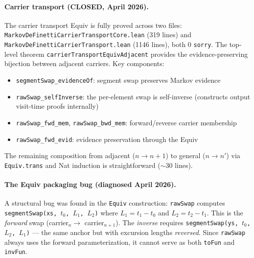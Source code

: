 \documentclass[11pt]{article}
\theoremstyle{definition}
\newcommand{\lean}[1]{\texttt{#1}}
\begin{document}
\paragraph{Carrier transport ({\color{provedgreen}CLOSED}, April 2026).}
The carrier transport Equiv is fully proved across two files:
\lean{MarkovDeFinettiCarrierTransportCore.lean} (319 lines) and
\lean{MarkovDeFinettiCarrierTransport.lean} (1146 lines), both 0
\texttt{sorry}.  The top-level theorem \lean{carrierTransportEquivAdjacent}
provides the evidence-preserving bijection between adjacent carriers.
Key components:
\begin{itemize}[leftmargin=2em]
\item \lean{segmentSwap\_evidenceOf}: segment swap preserves Markov evidence
\item \lean{rawSwap\_selfInverse}: the per-element swap is self-inverse
  (constructs output visit-time proofs internally)
\item \lean{rawSwap\_fwd\_mem}, \lean{rawSwap\_bwd\_mem}: forward/reverse
  carrier membership
\item \lean{rawSwap\_fwd\_evid}: evidence preservation through the Equiv
\end{itemize}
The remaining composition from adjacent ($n \to n{+}1$) to general
($n \to n'$) via \lean{Equiv.trans} and Nat induction is
straightforward ($\sim$30 lines).

\paragraph{The Equiv packaging bug (diagnosed April 2026).}
A structural bug was found in the \texttt{Equiv} construction:
\lean{rawSwap} computes \lean{segmentSwap(xs, $t_0$, $L_1$, $L_2$)}
where $L_1 = t_1 - t_0$ and $L_2 = t_2 - t_1$.  This is the
\emph{forward} swap (carrier${}_n \to$ carrier${}_{n+1}$).  The
\emph{inverse} requires \lean{segmentSwap(ys, $t_0$, $L_2$, $L_1$)}
--- the same anchor but with excursion lengths \emph{reversed}.
Since \lean{rawSwap} always uses the forward parameterization,
it cannot serve as both \lean{toFun} and \lean{invFun}.
\end{document}
